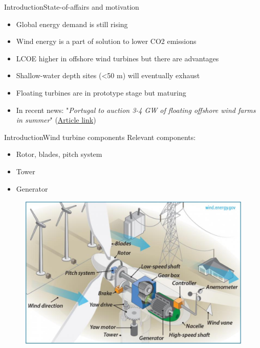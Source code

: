 \begin{frame}{Introduction}{State-of-affairs and motivation}
	\begin{itemize}
		\item Global energy demand is still rising
		\item Wind energy is a part of solution to lower CO2 emissions
		\item LCOE higher in offshore wind turbines but there are advantages
		\item Shallow-water depth sites (<50 m) will eventually exhaust
		\item Floating turbines are in prototype stage but maturing
		\item In recent news: "\textit{Portugal to auction 3-4 GW of floating offshore wind farms in summer}" (\href{https://www.reuters.com/business/energy/portugal-auction-3-4-gw-floating-offshore-wind-farms-summer-2022-03-16/}{Article link})
	\end{itemize}\bigskip
\end{frame}


\begin{frame}{Introduction}{Wind turbine components}
	Relevant components:
	\begin{itemize}
		\item Rotor, blades, pitch system
		\item Tower
		\item Generator
	\end{itemize}
	\begin{figure}[ht]
		\centering
		\includegraphics[width=0.7\linewidth]{../Graphics/WtComponents.png}
		\label{fig:wt_components}
	\end{figure}

\end{frame}


